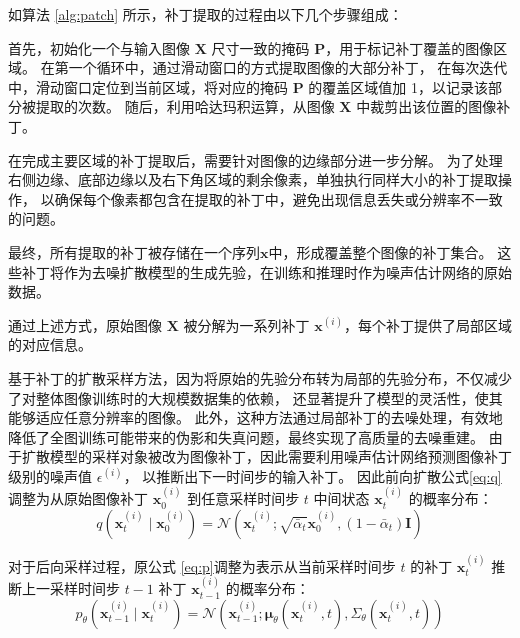 如算法 \ref{alg:patch} 所示，补丁提取的过程由以下几个步骤组成：

首先，初始化一个与输入图像 $\bm{X}$ 尺寸一致的掩码 $\bm{P}$，用于标记补丁覆盖的图像区域。
在第一个循环中，通过滑动窗口的方式提取图像的大部分补丁，
在每次迭代中，滑动窗口定位到当前区域，将对应的掩码 $\bm{P}$ 的覆盖区域值加 1，以记录该部分被提取的次数。
随后，利用哈达玛积运算，从图像 $\bm{X}$ 中裁剪出该位置的图像补丁。

在完成主要区域的补丁提取后，需要针对图像的边缘部分进一步分解。
为了处理右侧边缘、底部边缘以及右下角区域的剩余像素，单独执行同样大小的补丁提取操作，
以确保每个像素都包含在提取的补丁中，避免出现信息丢失或分辨率不一致的问题。

最终，所有提取的补丁被存储在一个序列$\mathbf{x}$中，形成覆盖整个图像的补丁集合。
这些补丁将作为去噪扩散模型的生成先验，在训练和推理时作为噪声估计网络的原始数据。


通过上述方式，原始图像 $\bm{X}$ 被分解为一系列补丁 ${\mathbf{x}^{(i)}}$，每个补丁提供了局部区域的对应信息。


基于补丁的扩散采样方法，因为将原始的先验分布转为局部的先验分布，不仅减少了对整体图像训练时的大规模数据集的依赖，
还显著提升了模型的灵活性，使其能够适应任意分辨率的图像。
此外，这种方法通过局部补丁的去噪处理，有效地降低了全图训练可能带来的伪影和失真问题，最终实现了高质量的去噪重建。
由于扩散模型的采样对象被改为图像补丁，因此需要利用噪声估计网络预测图像补丁级别的噪声值 $\epsilon^{(i)}$，
以推断出下一时间步的输入补丁。
因此前向扩散公式\eqref{eq:q}调整为从原始图像补丁 $\mathbf{x}^{(i)}_0$ 到任意采样时间步 $t$ 中间状态 $\mathbf{x}^{(i)}_t$ 的概率分布：
\begin{equation}
    \label{eq:q-patch}
        q\left(\mathbf{x}^{(i)}_t \mid \mathbf{x}^{(i)}_0\right)=\mathcal{N}\left(\mathbf{x}^{(i)}_t ; \sqrt{\bar{\alpha}_t} \mathbf{x}^{(i)}_0,\left(1-\bar{\alpha}_t\right) \mathbf{I}\right)
\end{equation}

对于后向采样过程，原公式 \eqref{eq:p}调整为表示从当前采样时间步 $t$ 的补丁 $\mathbf{x}^{(i)}_t$ 推断上一采样时间步 $t-1$ 补丁 $\mathbf{x}^{(i)}_{t-1}$ 的概率分布：
\begin{equation}
    \label{eq:p-patch}
    p_\theta\left(\mathbf{x}^{(i)}_{t-1} \mid \mathbf{x}^{(i)}_t\right) =\mathcal{N}\left(\mathbf{x}^{(i)}_{t-1} ; \boldsymbol{\mu}_\theta\left(\mathbf{x}^{(i)}_t, t\right), \Sigma_\theta\left(\mathbf{x}^{(i)}_t, t\right)\right)
\end{equation}

